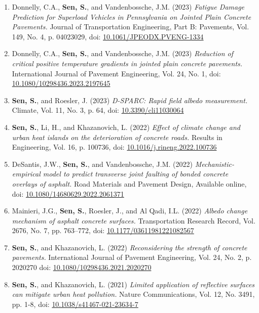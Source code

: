 \documentclass[12pt]{article}
\begin{document}
\begin{enumerate}
	\item Donnelly, C.A., \textbf{Sen, S.}, and Vandenbossche, J.M. (2023) \textit{Fatigue Damage Prediction for Superload Vehicles in Pennsylvania on Jointed Plain Concrete Pavements.}  Journal of Transportation Engineering, Part B: Pavements, Vol. 149, No. 4, p. 04023029, doi: \href{https://doi.org/10.1061/JPEODX.PVENG-1334}{10.1061/JPEODX.PVENG-1334}
	\item Donnelly, C.A., \textbf{Sen, S.}, and Vandenbossche, J.M. (2023) \textit{Reduction of critical positive temperature gradients in jointed plain concrete pavements.}  International Journal of Pavement Engineering, Vol. 24, No. 1, doi: \href{https://doi.org/10.1080/10298436.2023.2197645}{10.1080/10298436.2023.2197645}
	\item \textbf{Sen, S.}, and Roesler, J. (2023) \textit{D-SPARC: Rapid field albedo measurement.}  Climate, Vol. 11, No. 3, p. 64, doi: \href{https://doi.org/10.3390/cli11030064}{10.3390/cli11030064}
	\item \textbf{Sen, S.}, Li, H., and Khazanovich, L. (2022) \textit{Effect of climate change and urban heat islands on the deterioration of concrete roads.} Results in Engineering, Vol. 16, p. 100736, doi: \href{https://doi.org/10.1016/j.rineng.2022.100736}{10.1016/j.rineng.2022.100736}
	\item DeSantis, J.W., \textbf{Sen, S.}, and Vandenbossche, J.M. (2022) \textit{Mechanistic-empirical model to predict transverse joint faulting of bonded concrete overlays of asphalt.} Road Materials and Pavement Design, Available online, doi: \href{https://doi.org/10.1080/14680629.2022.2061371}{10.1080/14680629.2022.2061371}
	\item Mainieri, J.G., \textbf{Sen, S.}, Roesler, J., and Al Qadi, I.L. (2022) \textit{Albedo change mechanism of asphalt concrete surfaces.} Transportation Research Record, Vol. 2676, No. 7, pp. 763–772, doi: \href{https://doi.org/10.1177/036119812210825670}{10.1177/03611981221082567}
	\item \textbf{Sen, S.}, and Khazanovich, L. (2022) \textit{Reconsidering the strength of concrete pavements.} International Journal of Pavement Engineering, Vol. 24, No. 2, p. 2020270 doi: \href{https://doi.org/10.1080/10298436.2021.2020270}{10.1080/10298436.2021.2020270}
	\item \textbf{Sen, S.}, and Khazanovich, L. (2021) \textit{Limited application of reflective surfaces can mitigate urban heat pollution.} Nature Communications, Vol. 12, No. 3491, pp. 1-8, doi: \href{https://doi.org/10.1038/s41467-021-23634-7}{10.1038/s41467-021-23634-7}

\end{enumerate}
\end{document}
